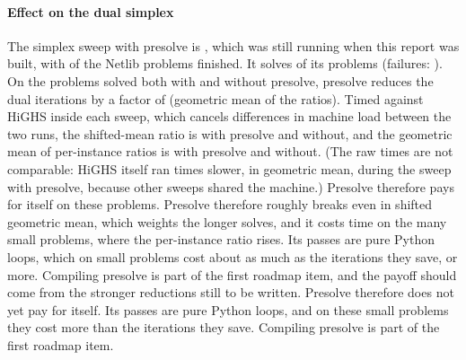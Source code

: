 \paragraph{Effect on the dual simplex}
The simplex sweep with presolve is \file{\presolveFile}\ifnum{}, which was still
running when this report was built, with \presolveDone{} of the \nNetlibFiles{} Netlib problems
finished\fi. It solves \presolveSolved{} of its \presolveDone{} problems (failures: \presolveFailNames). On the
\nPresolveCommon{} problems solved both with and without presolve, presolve reduces the dual
iterations by a factor of \presolveIterRatio{} (geometric mean of the ratios). Timed against HiGHS
inside each sweep, which cancels differences in machine load between the two runs, the shifted-mean
ratio is \presolveRatioHighs{} with presolve and \presolveRatioHighsVtwo{} without, and the geometric
mean of per-instance ratios is \presolveGmrHighsCommon{} with presolve and
\presolveGmrHighsCommonVtwo{} without.
(The raw times are not comparable: HiGHS itself ran \presolveLoad{} times slower, in geometric mean,
during the sweep with presolve, because other sweeps shared the machine.)
\ifnum{} Presolve therefore pays for itself on these problems.\fi
\ifnum{} Presolve therefore roughly breaks even in shifted geometric mean, which weights
the longer solves\ifnum{}, and it costs time on the many small problems, where the
per-instance ratio rises\fi. Its passes are pure Python loops, which on small problems cost about as
much as the iterations they save, or more. Compiling presolve is part of the first roadmap item, and
the payoff should come from the stronger reductions still to be written.\fi
\ifnum{} Presolve therefore does not yet pay for itself. Its passes are pure Python
loops, and on these small problems they cost more than the iterations they save. Compiling presolve is
part of the first roadmap item.\fi
\fi

